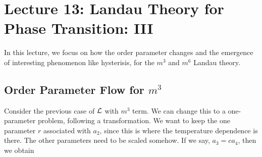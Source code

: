 \section*{Lecture 13: Landau Theory for Phase Transition: III}
In this lecture, we focus on how the order parameter changes and the emergence of interesting phenomenon like hysterisis, for the $m^3$ and $m^6$ Landau theory.
\subsection{Order Parameter Flow for $m^3$}
Consider the previous case of $\mathcal L$ with $m^3$ term. We can change this to a one-parameter problem, following a transformation. We want to keep the one parameter $r$ associated with $a_2$, since this is where the temperature dependence is there. The other parameters need to be scaled somehow. If we say, $a_3 = c a_4$, then we obtain 

